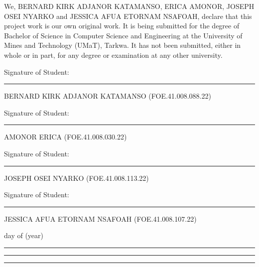 \documentclass[12pt, onehalfspacing, liststotoc, oneside, parskip, headsepline]{UMaT_Undergrauate_Report_Template_Configurations} %
\begin{document}
\vspace{-20pt}
\begin{declaration}
  \addchaptertocentry{\authorshipname}

  We, BERNARD KIRK ADJANOR KATAMANSO, ERICA AMONOR, JOSEPH OSEI NYARKO and JESSICA AFUA ETORNAM NSAFOAH, declare that this project work is our own original work. It is being submitted for the degree of Bachelor of Science in Computer Science and Engineering at the University of Mines and Technology (UMaT), Tarkwa. It has not been submitted, either in whole or in part, for any degree or examination at any other university.

  \vspace{20pt}

  Signature of Student: \hspace{1.5cm} \rule{9cm}{0.5pt}

  BERNARD KIRK ADJANOR KATAMANSO (FOE.41.008.088.22)

  \vspace{10pt}

  Signature of Student: \hspace{1.5cm} \rule{9cm}{0.5pt}

  AMONOR ERICA (FOE.41.008.030.22)

  \vspace{10pt}

  Signature of Student: \hspace{1.5cm} \rule{9cm}{0.5pt}

  JOSEPH OSEI NYARKO (FOE.41.008.113.22)

  \vspace{10pt}

  Signature of Student: \hspace{1.5cm} \rule{9cm}{0.5pt}

  JESSICA AFUA ETORNAM NSAFOAH (FOE.41.008.107.22)

  \vspace{1.5cm}

  \hspace{5.3em} day of\vspace{-10pt} \hspace{9em} (year)\vspace{-5pt}

  \noindent \rule[0.5em]{5em}{0.5pt} \hspace{3.5em} \rule[0.5em]{8em}{0.5pt} \hspace{3.2em} \rule[0.5em]{5em}{0.5pt}
\end{declaration}
\end{document}
